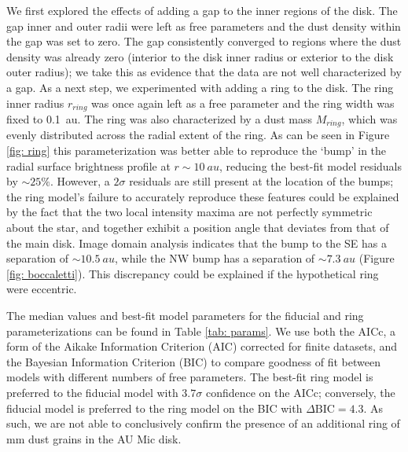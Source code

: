 \documentclass[modern]{aastex62}
\begin{document}
We first explored the effects of adding a gap  to the inner regions of the disk. 
The gap inner and outer radii were left as free parameters and the dust density within the gap was set to zero.
The gap consistently converged to regions where the dust density was already zero (interior to the disk inner radius or exterior to the disk outer radius); we take this as evidence that the data are not well characterized by a gap.
As a next step, we experimented with adding a ring to the disk.
The ring inner radius $r_{ring}$ was once again left as a free parameter and the ring width was fixed to \SI{0.1}{au}.
The ring was also characterized by a dust mass $M_{ring}$, which was evenly distributed across the radial extent of the ring. 
As can be seen in Figure \ref{fig: ring} this parameterization was better able to reproduce the `bump' in the radial surface brightness profile at $r \sim \SI{10}{au}$, reducing the best-fit model residuals by $\sim 25 \%$. 
However, a $2 \sigma$ residuals are still present at the location of the bumps; the ring model's failure to accurately reproduce these features could be explained by the fact that the two local intensity maxima are not perfectly symmetric about the star, and together exhibit a position angle that deviates from that of the main disk. 
Image domain analysis indicates that the bump to the SE has a separation of $\sim \SI{10.5}{au}$, while the NW bump has a separation of $\sim \SI{7.3}{au}$ (Figure \ref{fig: boccaletti}). 
This discrepancy could be explained if the hypothetical ring were eccentric.

The median values and best-fit model parameters for the fiducial and ring parameterizations can be found in Table \ref{tab: params}. 
We use both the AICc, a form of the Aikake Information Criterion (AIC) corrected for finite datasets, and the Bayesian Information Criterion (BIC) to compare goodness of fit between models with different numbers of free parameters.  
The best-fit ring model is preferred to the fiducial model with $3.7 \sigma$ confidence on the AICc; conversely, the fiducial model is preferred to the ring model on the BIC with $\Delta \text{BIC} = 4.3$.
As such, we are not able to conclusively confirm the presence of an additional ring of mm dust grains in the AU Mic disk.
\end{document}
